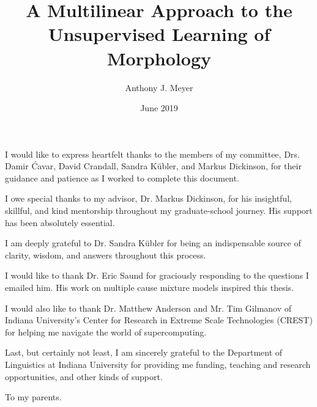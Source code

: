\documentclass[showabstract,showacknowledgments,showdedication]{iuphd}
\title{A Multilinear Approach to the Unsupervised Learning of Morphology}
\author{Anthony J. Meyer}
\date{June 2019} %
\theoremstyle{remark}
\theoremstyle{remark}
\theoremstyle{remark}
\theoremstyle{remark}
\begin{document}
\maketitle
\acceptancepage

\copyrightpage



\begin{acknowledgments}
I would like to express heartfelt thanks to the members of my committee, Drs. Damir \'{C}avar, David Crandall, Sandra K\"{u}bler, and Markus Dickinson, for their guidance and patience as I worked to complete this document. 

I owe special thanks to my advisor, Dr. Markus Dickinson, for his insightful, skillful, and kind mentorship throughout my graduate-school journey. His support has been absolutely essential.

I am deeply grateful to Dr. Sandra K\"{u}bler for being an indispensable source of clarity, wisdom, and answers throughout this process.

I would like to thank Dr. Eric Saund for graciously responding to the questions I emailed him. His work on multiple cause mixture models inspired this thesis.

I would also like to thank Dr. Matthew Anderson and Mr. Tim Gilmanov of Indiana University’s Center for Research in Extreme Scale Technologies (CREST) for helping me navigate the world of supercomputing.

Last, but certainly not least, I am sincerely grateful to the Department of Linguistics at Indiana University for providing me funding, teaching and research opportunities, and other kinds of support.
\end{acknowledgments}


\begin{dedication}
To my parents.
\end{dedication}



\end{document}
